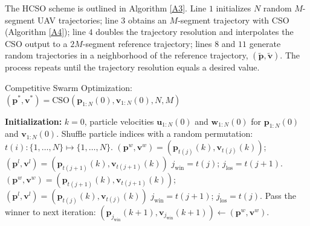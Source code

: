 \documentclass[12pt, draftcls, onecolumn]{IEEEtran}
\theoremstyle{plain}
\theoremstyle{definition}
\theoremstyle{remark}
\begin{document}
The HCSO scheme is outlined in Algorithm \ref{A3}. Line $1$ initializes $N$ random $M$-segment UAV trajectories; line $3$ obtains an $M$-segment trajectory with CSO \cite{CSO} (Algorithm \ref{A4}); line $4$ doubles the trajectory resolution and interpolates the CSO output to a $2M$-segment reference trajectory; lines $8$ and $11$ generate random trajectories in a neighborhood of the reference trajectory, $(\tilde{\mathbf p}, \tilde{\mathbf v})$. The process repeats until the trajectory resolution equals a desired value.

\begin{algorithm}[t]
\caption{Competitive Swarm Optimization: $(\mathbf{p}^{*},\mathbf{v}^{*}){=}\mathrm{CSO}\left(\mathbf{p}_{1:N}(0),\mathbf{v}_{1:N}(0),N,M\right)$}\label{A4}
    \begin{algorithmic}[1]
    	\State \textbf{Initialization:} $k{=}0$, particle velocities $\mathbf{u}_{1:N}(0)$ and $\mathbf{w}_{1:N}(0)$ for $\mathbf{p}_{1:N}(0)$ and $\mathbf{v}_{1:N}(0)$.
    	\vspace{.2cm}
    	\Repeat
    	    \vspace{.2cm}
    		\State Shuffle particle indices with a random permutation: $t(i):\{1,{\dots},N\}{\mapsto}\{1,{\dots},N\}$.
    		\vspace{.2cm}
    		    \vspace{.2cm}
    			    \vspace{.2cm}
    				\State $(\mathbf{p}^{w},\mathbf{v}^{w}){=}(\mathbf{p}_{t(j)}(k), \mathbf{v}_{t(j)}(k))$; $(\mathbf{p}^{l},\mathbf{v}^{l}){=}(\mathbf{p}_{t(j{+}1)}(k), \mathbf{v}_{t(j{+}1)}(k))$
    				\vspace{.2cm}
    				\State $j_{\mathrm{win}}{=}t(j)$; $j_{\mathrm{los}}{=}t(j{+}1)$.
    				\vspace{.2cm}
    			\Else
    			    \vspace{.2cm}
    				\State $(\mathbf{p}^{w},\mathbf{v}^{w}){=}(\mathbf{p}_{t(j{+}1)}(k), \mathbf{v}_{t(j{+}1)}(k))$; $(\mathbf{p}^{l},\mathbf{v}^{l}){=}(\mathbf{p}_{t(j)}(k), \mathbf{v}_{t(j)}(k))$
    				\vspace{.2cm}
    				\State $j_{\mathrm{win}}{=}t(j{+}1)$; $j_{\mathrm{los}}{=}t(j)$.
    				\vspace{.2cm}
    			\EndIf
    			\vspace{.2cm}
    			\State Pass the winner to next iteration: $(\mathbf{p}_{j_{\mathrm{win}}}(k{+}1),\mathbf{v}_{j_{\mathrm{win}}}(k{+}1)){\gets}(\mathbf{p}^{w},\mathbf{v}^{w})$.

\end{algorithmic}
\end{algorithm}
\end{document}
